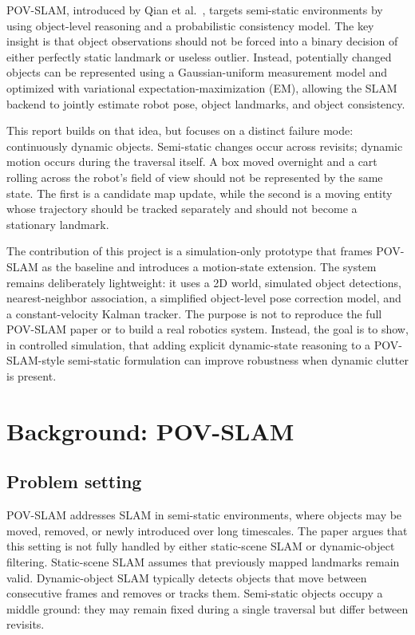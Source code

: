 ﻿\documentclass[11pt]{article}
\begin{document}
POV-SLAM, introduced by Qian et al.~\cite{qian2023povslam}, targets semi-static environments by using object-level reasoning and a probabilistic consistency model. The key insight is that object observations should not be forced into a binary decision of either perfectly static landmark or useless outlier. Instead, potentially changed objects can be represented using a Gaussian-uniform measurement model and optimized with variational expectation-maximization (EM), allowing the SLAM backend to jointly estimate robot pose, object landmarks, and object consistency.

This report builds on that idea, but focuses on a distinct failure mode: continuously dynamic objects. Semi-static changes occur across revisits; dynamic motion occurs during the traversal itself. A box moved overnight and a cart rolling across the robot's field of view should not be represented by the same state. The first is a candidate map update, while the second is a moving entity whose trajectory should be tracked separately and should not become a stationary landmark.

The contribution of this project is a simulation-only prototype that frames POV-SLAM as the baseline and introduces a motion-state extension. The system remains deliberately lightweight: it uses a 2D world, simulated object detections, nearest-neighbor association, a simplified object-level pose correction model, and a constant-velocity Kalman tracker. The purpose is not to reproduce the full POV-SLAM paper or to build a real robotics system. Instead, the goal is to show, in controlled simulation, that adding explicit dynamic-state reasoning to a POV-SLAM-style semi-static formulation can improve robustness when dynamic clutter is present.

\section{Background: POV-SLAM}
\subsection{Problem setting}
POV-SLAM addresses SLAM in semi-static environments, where objects may be moved, removed, or newly introduced over long timescales. The paper argues that this setting is not fully handled by either static-scene SLAM or dynamic-object filtering. Static-scene SLAM assumes that previously mapped landmarks remain valid. Dynamic-object SLAM typically detects objects that move between consecutive frames and removes or tracks them. Semi-static objects occupy a middle ground: they may remain fixed during a single traversal but differ between revisits.
\end{document}
